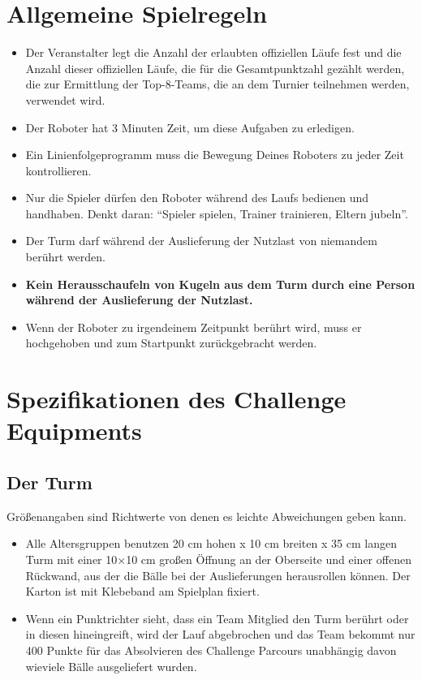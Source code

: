 \documentclass[a4paper,12pt]{article}
\begin{document}
\section{Allgemeine Spielregeln}
\begin{itemize}
	\item Der Veranstalter legt die Anzahl der erlaubten offiziellen Läufe
		fest und die Anzahl dieser offiziellen Läufe, die für die
		Gesamtpunktzahl gezählt werden, die zur Ermittlung der
		Top-8-Teams, die an dem Turnier teilnehmen werden, verwendet
		wird.
	\item Der Roboter hat 3 Minuten Zeit, um diese Aufgaben zu erledigen.
	\item Ein Linienfolgeprogramm muss die Bewegung Deines Roboters zu
		jeder Zeit kontrollieren.
	\item Nur die Spieler dürfen den Roboter während des Laufs bedienen und
		handhaben. Denkt daran: ``Spieler spielen, Trainer trainieren,
		Eltern jubeln''.
	\item Der Turm darf während der Auslieferung der Nutzlast von niemandem
		berührt werden.
	\item \textbf{Kein Herausschaufeln von Kugeln aus dem Turm durch eine
		Person während der Auslieferung der Nutzlast.}
	\item Wenn der Roboter zu irgendeinem Zeitpunkt berührt wird, muss er
		hochgehoben und zum Startpunkt zurückgebracht werden.
\end{itemize}

\section{Spezifikationen des Challenge Equipments}

\subsection{Der Turm}
Größenangaben sind Richtwerte von denen es leichte Abweichungen geben kann.
\begin{itemize}
	\item Alle Altersgruppen benutzen 20 cm hohen x 10 cm breiten x 35 cm
		langen Turm mit einer 10×10 cm großen Öffnung an der Oberseite
		und einer offenen Rückwand, aus der die Bälle bei der
		Auslieferungen herausrollen können. Der Karton ist mit
		Klebeband am Spielplan fixiert.
	\item Wenn ein Punktrichter sieht, dass ein Team Mitglied den Turm
		berührt oder in diesen hineingreift, wird der Lauf abgebrochen
		und das Team bekommt nur 400 Punkte für das Absolvieren des
		Challenge Parcours unabhängig davon wieviele Bälle ausgeliefert
		wurden.
\end{itemize}
\end{document}
